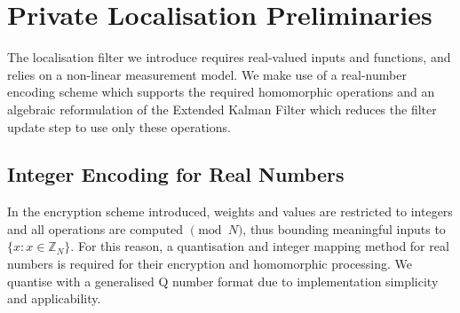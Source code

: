 \documentclass[twocolumn]{autart}
\begin{document}
% 
%                                                                                 
%                                                                                 
%                                                                                 
% 

\section{Private Localisation Preliminaries} \label{sec:loc_prelim}
The localisation filter we introduce requires real-valued inputs and functions, and relies on a non-linear measurement model. We make use of a real-number encoding scheme which supports the required homomorphic operations and an algebraic reformulation of the Extended Kalman Filter which reduces the filter update step to use only these operations.

% 
% 

\subsection{Integer Encoding for Real Numbers}
In the encryption scheme introduced, weights and values are restricted to integers and all operations are computed $\pmod{N}$, thus bounding meaningful inputs to $\{x : x \in \mathbb{Z}_N\}$. For this reason, a quantisation and integer mapping method for real numbers is required for their encryption and homomorphic processing. We quantise with a generalised Q number format \cite{oberstarFixedPointRepresentationFractional2007} due to implementation simplicity and applicability.
\end{document}
